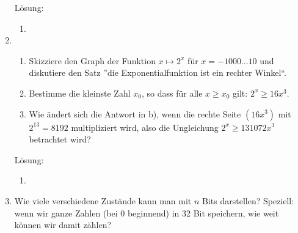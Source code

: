 \documentclass[../main.tex]{subfiles}
\begin{document}
\begin{enumerate}
	      Lösung:
	      \begin{enumerate}
		      \item
	      \end{enumerate}
	\item \begin{enumerate}
		      \item Skizziere den Graph der Funktion \begin{math}
			            x \mapsto 2^x
		            \end{math} für \begin{math}
			            x = -1000 \dots 10
		            \end{math} und diskutiere den Satz ”die Exponentialfunktion ist ein rechter Winkel“.
		      \item Bestimme die kleinste Zahl \begin{math}
			            x_0
		            \end{math}, so dass für alle \begin{math}
			            x \geq x_0
		            \end{math} gilt: \begin{math}
			            2^x \geq 16x^3
		            \end{math}.
		      \item Wie ändert sich die Antwort in b),
		            wenn die rechte Seite \begin{math}
			            (16x^3)
		            \end{math} mit \begin{math}
			            2^{13} = 8192
		            \end{math} multipliziert wird, also die Ungleichung \begin{math}
			            2^x \geq 131072 x^3
		            \end{math} betrachtet wird?
	      \end{enumerate}

	      Lösung:
	      \begin{enumerate}
		      \item
	      \end{enumerate}
	\item Wie viele verschiedene Zustände kann man mit \begin{math}
		      n
	      \end{math} Bits darstellen?
	      Speziell: wenn wir ganze Zahlen (bei 0 beginnend) in 32 Bit speichern,
	      wie weit können wir damit zählen?


\end{enumerate}
\end{document}

